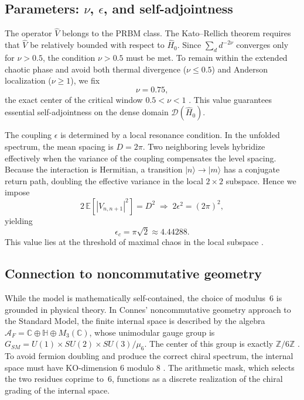 \documentclass[11pt,a4paper]{article}
\begin{document}
\subsection{Parameters: \texorpdfstring{$\nu$}{nu}, \texorpdfstring{$\epsilon$}{epsilon}, and self-adjointness}

The operator $\hat V$ belongs to the PRBM class. The Kato--Rellich theorem requires that $\hat V$ be relatively bounded with respect to $\hat H_0$. Since $\sum_d d^{-2\nu}$ converges only for $\nu>0.5$, the condition $\nu>0.5$ must be met. To remain within the extended chaotic phase and avoid both thermal divergence ($\nu\le0.5$) and Anderson localization ($\nu\ge1$), we fix
\begin{equation}
\nu = 0.75,
\end{equation}
the exact center of the critical window $0.5<\nu<1$ \cite{Mirlin1996}. This value guarantees essential self-adjointness on the dense domain $\mathcal{D}(\hat H_0)$.

The coupling $\epsilon$ is determined by a local resonance condition. In the unfolded spectrum, the mean spacing is $D=2\pi$. Two neighboring levels hybridize effectively when the variance of the coupling compensates the level spacing. Because the interaction is Hermitian, a transition $|n\rangle\to|m\rangle$ has a conjugate return path, doubling the effective variance in the local $2\times2$ subspace. Hence we impose
\begin{equation}
2\,\mathbb{E}[|V_{n,n+1}|^2] = D^2 \;\Longrightarrow\; 2\epsilon^2 = (2\pi)^2,
\end{equation}
yielding
\begin{equation}
\boxed{\epsilon_c = \pi\sqrt{2} \approx 4.44288}.
\label{eq:epsilon}
\end{equation}
This value lies at the threshold of maximal chaos in the local subspace \cite{Cunden2018,Gross1980}.

\subsection{Connection to noncommutative geometry}

While the model is mathematically self-contained, the choice of modulus~6 is grounded in physical theory. In Connes' noncommutative geometry approach to the Standard Model, the finite internal space is described by the algebra $\mathcal{A}_F = \mathbb{C}\oplus\mathbb{H}\oplus M_3(\mathbb{C})$, whose unimodular gauge group is $G_{SM} = U(1)\times SU(2)\times SU(3)/\mu_6$. The center of this group is exactly $\mathbb{Z}/6\mathbb{Z}$ \cite{Connes2008}. To avoid fermion doubling and produce the correct chiral spectrum, the internal space must have KO-dimension $6$ modulo $8$ \cite{Chamseddine2007}. The arithmetic mask, which selects the two residues coprime to~6, functions as a discrete realization of the chiral grading of the internal space. 
\end{document}
